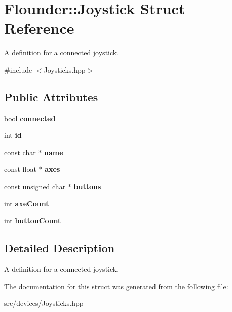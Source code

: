 \hypertarget{struct_flounder_1_1_joystick}{}\section{Flounder\+:\+:Joystick Struct Reference}
\label{struct_flounder_1_1_joystick}


A definition for a connected joystick.  




{\ttfamily \#include $<$Joysticks.\+hpp$>$}

\subsection*{Public Attributes}
\begin{DoxyCompactItemize}
\item 
\mbox{\label{struct_flounder_1_1_joystick_a44ab52a994f86966a3e6c9eb7016d4e7}} 
bool {\bfseries connected}
\item 
\mbox{\label{struct_flounder_1_1_joystick_a82ea3382a4d6851b53aac4ef03406779}} 
int {\bfseries id}
\item 
\mbox{\label{struct_flounder_1_1_joystick_adfeeb927d4756226b2eaab3870ad8b12}} 
const char $\ast$ {\bfseries name}
\item 
\mbox{\label{struct_flounder_1_1_joystick_a95480adfef7124964fd62576250d4028}} 
const float $\ast$ {\bfseries axes}
\item 
\mbox{\label{struct_flounder_1_1_joystick_aaadf942369137ad345cc95d46fc2eb4d}} 
const unsigned char $\ast$ {\bfseries buttons}
\item 
\mbox{\label{struct_flounder_1_1_joystick_a33558c6ce62cc82368973e0b9331d710}} 
int {\bfseries axe\+Count}
\item 
\mbox{\label{struct_flounder_1_1_joystick_ad760478d8ac3e42ac4c34ffcdf995493}} 
int {\bfseries button\+Count}
\end{DoxyCompactItemize}


\subsection{Detailed Description}
A definition for a connected joystick. 



The documentation for this struct was generated from the following file\+:\begin{DoxyCompactItemize}
\item 
src/devices/Joysticks.\+hpp\end{DoxyCompactItemize}
